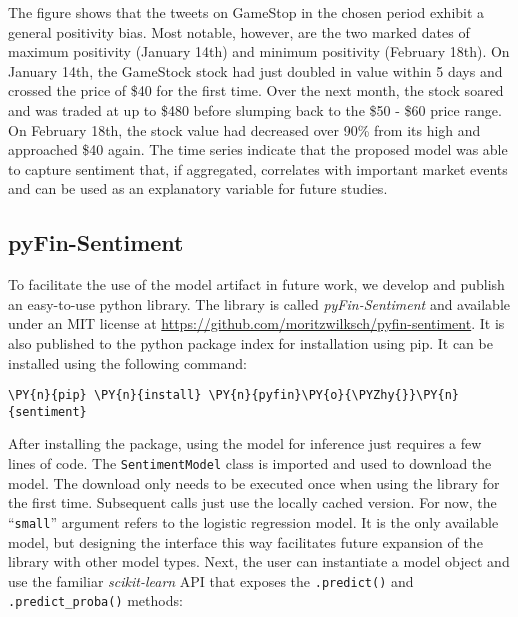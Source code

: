 The figure shows that the tweets on GameStop in the chosen period exhibit a general positivity bias. Most notable, however, are the two marked dates of maximum positivity (January 14th) and minimum positivity (February 18th). On January 14th, the GameStock stock had just doubled in value within 5 days and crossed the price of \$40 for the first time. Over the next month, the stock soared and was traded at up to \$480 before slumping back to the \$50 - \$60 price range. On February 18th, the stock value had decreased over 90\% from its high and approached \$40 again.
The time series indicate that the proposed model was able to capture sentiment that, if aggregated, correlates with important market events and can be used as an explanatory variable for future studies.


\subsection{pyFin-Sentiment}
To facilitate the use of the model artifact in future work, we develop and publish an easy-to-use python library. The library is called \emph{pyFin-Sentiment} and available under an MIT license at \url{https://github.com/moritzwilksch/pyfin-sentiment}. It is also published to the python package index for installation using pip. It can be installed using the following command:

\begin{Verbatim}[commandchars=\\\{\}]
\PY{n}{pip} \PY{n}{install} \PY{n}{pyfin}\PY{o}{\PYZhy{}}\PY{n}{sentiment}
\end{Verbatim}

After installing the package, using the model for inference just requires a few lines of code. The \texttt{SentimentModel} class is imported and used to download the model. The download only needs to be executed once when using the library for the first time. Subsequent calls just use the locally cached version. For now, the ``\texttt{small}'' argument refers to the logistic regression model. It is the only available model, but designing the interface this way facilitates future expansion of the library with other model types. Next, the user can instantiate a model object and use the familiar \emph{scikit-learn} API that exposes the \texttt{.predict()} and \texttt{.predict\_proba()} methods:



